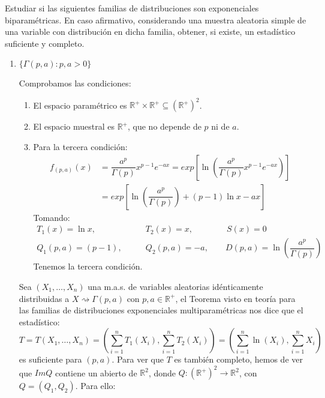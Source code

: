 \begin{ejercicio}
    Estudiar si las siguientes familias de distribuciones son exponenciales biparamétricas.  En caso afirmativo, considerando una muestra aleatoria simple de una variable con distribución en dicha familia, obtener, si existe, un estadístico suficiente y completo.
    \begin{enumerate}[label=\alph*)]
        \item $\{\Gamma(p,a) : p,a>0\}$

            Comprobamos las condiciones:
            \begin{enumerate}[label=\arabic*.]
                \item El espacio paramétrico es $\mathbb{R}^+\times \mathbb{R}^+\subseteq {(\mathbb{R}^+)}^{2}$.
                \item El espacio muestral es $\mathbb{R}^+$, que no depende de $p$ ni de $a$.
                \item Para la tercera condición:
                    \begin{align*}
                        f_{(p,a)}(x) &= \dfrac{a^p}{\Gamma(p)} x^{p-1}e^{-ax} = exp\left[\ln\left(\dfrac{a^p}{\Gamma(p)} x^{p-1}e^{-ax} \right)\right] \\ &= exp\left[\ln\left(\dfrac{a^p}{\Gamma(p)}\right) + (p-1)\ln x - ax\right]
                    \end{align*}
                Tomando:
                \begin{align*}
                    T_1(x) = \ln x, &\qquad  T_2(x) = x, \qquad \qquad   S(x) = 0 \\
                    Q_1(p,a) = (p-1), &\qquad Q_2(p,a) = -a, \qquad D(p,a) = \ln\left(\dfrac{a^p}{\Gamma(p)}\right) 
                \end{align*}
                Tenemos la tercera condición.
            \end{enumerate}
            Sea $(X_1, \ldots, X_n)$ una m.a.s. de variables aleatorias idénticamente distribuidas a $X\rightsquigarrow \Gamma(p,a)$ con $p,a\in \mathbb{R}^+$, el Teorema visto en teoría para las familias de distribuciones exponenciales multiparamétricas nos dice que el estadístico:
            \begin{equation*}
                T = T(X_1, \ldots, X_n) = \left(\sum_{i=1}^{n}T_1(X_i), \sum_{i=1}^{n}T_2(X_i)\right) = \left(\sum_{i=1}^{n}\ln(X_i), \sum_{i=1}^{n}X_i\right)
            \end{equation*}
            es suficiente para $(p,a)$. Para ver que $T$ es también completo, hemos de ver que $Im Q$ contiene un abierto de $\mathbb{R}^2$, donde $Q:{(\mathbb{R}^+)}^{2}\to \mathbb{R}^2$, con $Q=(Q_1,Q_2)$. Para ello:

\end{enumerate}
\end{ejercicio}
